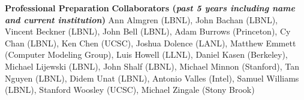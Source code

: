 \documentclass[11pt,letterpaper,english]{article}
\begin{document}
\begin{flushleft} {\bf Professional Preparation}
\vspace{-6pt}
{\bf Collaborators ({\emph{past 5 years including name and current institution}})} 
{\parindent 16pt
Ann Almgren (LBNL),
John Bachan (LBNL),
Vincent Beckner (LBNL),
John Bell (LBNL),
Adam Burrows (Princeton),
Cy Chan (LBNL),
Ken Chen (UCSC),
Joshua Dolence (LANL),
Matthew Emmett (Computer Modeling Group),
Luis Howell (LLNL),
Daniel Kasen (Berkeley),
Michael Lijewski (LBNL),
John Shalf (LBNL),
Michael Minnon (Stanford),
Tan Nguyen (LBNL),
Didem Unat (LBNL),
Antonio Valles (Intel),
Samuel Williams (LBNL),
Stanford Woosley (UCSC),
Michael Zingale (Stony Brook)
}


\end{flushleft}
\end{document}
